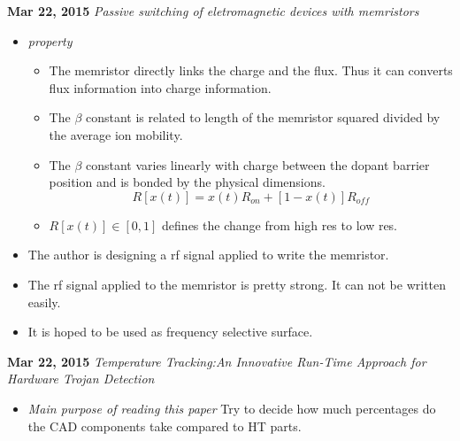 \documentclass[]{article}
\begin{document}
\noindent \textbf{Mar 22, 2015}
\textit{Passive switching of eletromagnetic devices with memristors}
\indent		\begin{itemize}
        \item \textit{property} 
            \begin{itemize}
                \item The memristor directly links the charge and the flux. Thus it can
                converts flux information into charge information.             
                \item The $\beta$ constant is related to length of the memristor squared
                divided by the average ion mobility.
                \item The $\beta$ constant varies linearly with charge between the
                dopant barrier position and is bonded by the physical dimensions.
                \begin{equation}
                    R[x(t)] = x(t)R_{on}+[1-x(t)]R_{off}
                \end{equation}
                \item $R[x(t)]\in[0,1]$ defines the change from high res to low
                res.
            \end{itemize}
        \item The author is designing a rf signal applied to write the
        memristor.
        \item The rf signal applied to the memristor is pretty strong. It can
        not be written easily.
        \item It is hoped to be used as frequency selective surface.

        \end{itemize}

\noindent \textbf{Mar 22, 2015}
\textit{Temperature Tracking:An Innovative Run-Time Approach for Hardware Trojan
    Detection}
\indent		\begin{itemize}
                \item \textit{Main purpose of reading this paper} Try to decide
                how much percentages do the CAD components take compared to HT
                parts.
            \end{itemize}
\end{document}

